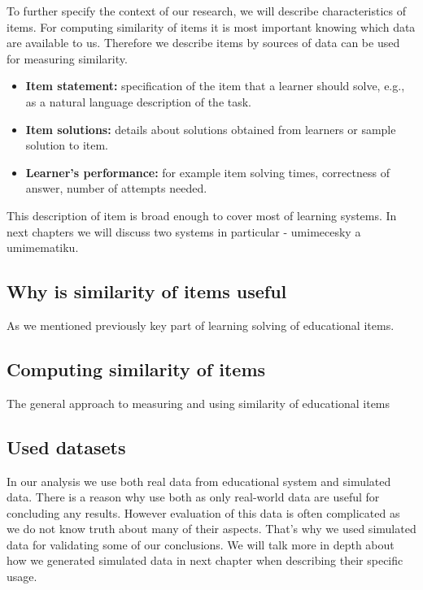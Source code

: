 \documentclass[
  digital, %
  table,   %
  nolof,     %
  nolot,     %
  nocover
]{fithesis3}
\begin{document}
To further specify the context of our research, we will describe
characteristics of items. For computing similarity of items it is most
important knowing which data are available to us. Therefore we describe
items by sources of data can be used for measuring similarity.

\begin{itemize}
\item
  \textbf{Item statement:} specification of the item that a learner
  should solve, e.g., as a natural language description of the task.
\item
  \textbf{Item solutions:} details about solutions obtained from
  learners or sample solution to item.
\item
  \textbf{Learner's performance:} for example item solving times,
  correctness of answer, number of attempts needed.
\end{itemize}

This description of item is broad enough to cover most of learning
systems. In next chapters we will discuss two systems in particular -
umimecesky a umimematiku.

\subsection{Why is similarity of items useful}\label{why-is-similarity-of-items-useful}


As we mentioned previously key part of learning solving of educational
items.

\subsection{Computing similarity of
items}\label{computing-similarity-of-items}


The general approach to measuring and using similarity of educational
items

\subsection{Used datasets}\label{used-datasets}



In our analysis we use both real data from educational system and
simulated data. There is a reason why use both as only real-world data
are useful for concluding any results. However evaluation of this data
is often complicated as we do not know truth about many of their
aspects. That's why we used simulated data for validating some of our
conclusions. We will talk more in depth about how we generated simulated
data in next chapter when describing their specific usage.
\end{document}
